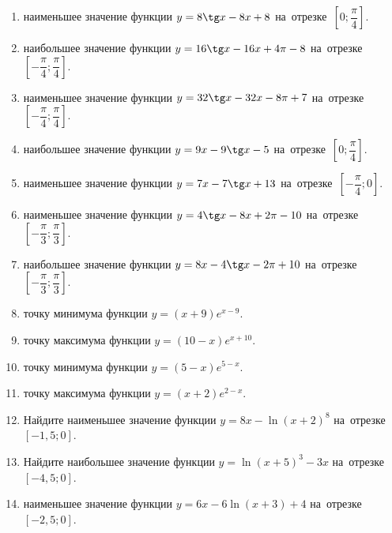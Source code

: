\documentclass[a4paper,10pt]{article}
\begin{document}
\begin{enumerate}
\item {} наименьшее значение функции $y=8\tg x-8x+8$ на~отрезке~$\left[0;\dfrac{\pi }{4}\right]$.

\item {} наибольшее значение функции $y=16\tg x-16x+4\pi -8$ на~отрезке~$\left[-\dfrac{\pi }{4};\dfrac{\pi }{4}\right]$.

\item {} наименьшее значение функции $y=32\tg x-32x-8\pi +7$ на~отрезке~$\left[-\dfrac{\pi }{4};\dfrac{\pi }{4}\right]$.

\item {} наибольшее значение функции $y=9x-9\tg x-5$ на~отрезке~$\left[0;\dfrac{\pi }{4}\right]$.

\item {} наименьшее значение функции $y=7x-7\tg x+13$ на~отрезке~$\left[-\dfrac{\pi }{4};0\right]$.

\item {} наименьшее значение функции $y=4\tg x-8x+2\pi -10$ на~отрезке~$\left[-\dfrac{\pi }{3};\dfrac{\pi }{3}\right]$.

\item {} наибольшее значение функции $y=8x-4\tg x-2\pi +10$ на~отрезке~$\left[-\dfrac{\pi }{3};\dfrac{\pi }{3}\right]$.

\item {} точку минимума функции $y=\left(x+9\right)e^{x-9}$.

\item {} точку максимума функции $y=\left(10-x\right)e^{x+10}$.

\item {} точку минимума функции $y=\left(5-x\right)e^{5-x}$.

\item {} точку максимума функции $y=\left(x+2\right)e^{2-x}$.

\item Найдите наименьшее значение функции $y=8x-\ln \left(x+2\right)^8$ на~отрезке~$\left[-1,5;0\right]$.

\item Найдите наибольшее значение функции $y=\ln \left(x+5\right)^3-3x$ на~отрезке~$\left[-4,5;0\right]$.

\item {} наименьшее значение функции $y=6x-6\ln \left(x+3\right)+4$ на~отрезке~$\left[-2,5;0\right]$.


\end{enumerate}
\end{document}
